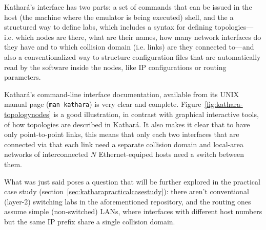 Kathará's interface has two parts: a set of commands that can be issued in the host (the machine where the emulator is being executed) shell, and the a structured way to define labs, which includes a syntax for defining topologies---i.e. which nodes are there, what are their names, how many network interfaces do they have and to which collision domain (i.e. links) are they connected to---and also a conventionalized way to structure configuration files that are automatically read by the software inside the nodes, like IP configurations or routing parameters.

Kathará's command-line interface documentation, available from its UNIX manual page (\hbox{\texttt{man kathara}}) is very clear and complete.
Figure~\ref{fig:kathara-topologynodes} is a good illustration, in contrast with graphical interactive tools, of how topologies are described in Kathará.
It also makes it clear that to have only point-to-point links, this means that only each two interfaces that are connected via that each link need a separate collision domain and local-area networks of interconnected $N$ Ethernet-equiped hosts need a switch between them.

What was just said poses a question that will be further explored in the practical case study (section~\ref{sec:katharapracticalcasestudy}): there aren't conventional (layer-2) switching labs in the aforementioned repository, and the routing ones assume simple (non-switched) LANs, where interfaces with different host numbers but the same IP prefix share a single collision domain.



